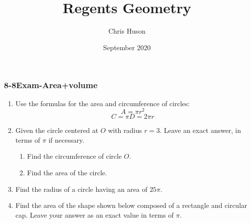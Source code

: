 \documentclass[12pt, twoside]{article}
\title{Regents Geometry}
\author{Chris Huson}
\date{September 2020}
\begin{document}
\subsubsection*{8-8Exam-Area+volume}
\begin{enumerate}
\item Use the formulas for the area and circumference of circles:
  \[A=\pi r^2\]
  \[C=\pi D = 2\pi r\]
  
\item Given the circle centered at $O$ with radius $r=3$. Leave an exact answer, in terms of $\pi$ if necessary.
  \begin{multicols}{2}
    \begin{enumerate}
      \item Find the circumference of circle $O$. %
      \item Find the area of the circle.\vspace{2cm}
    \end{enumerate}
  \end{multicols}

\item Find the radius of a circle having an area of $25 \pi$. \vspace{2cm}
  
\item Find the area of the shape shown below composed of a rectangle and circular cap. Leave your answer as an exact value in terms of $\pi$.
    \begin{flushright}
  \end{flushright}\vspace{1cm}


\end{enumerate}
\end{document}
